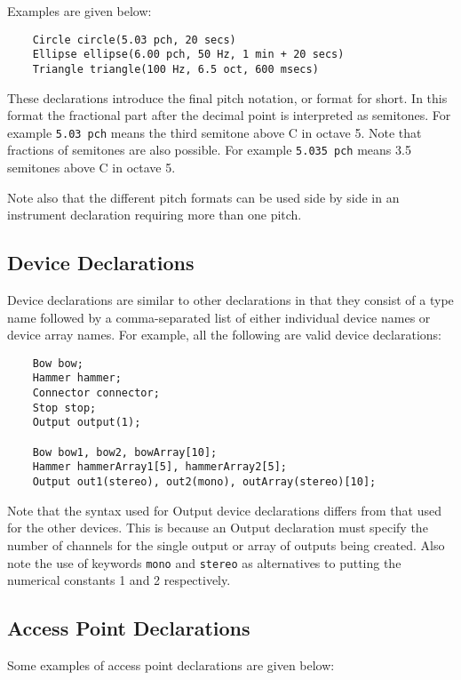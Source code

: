 Examples are given below:

\begin{verbatim}
    Circle circle(5.03 pch, 20 secs)
    Ellipse ellipse(6.00 pch, 50 Hz, 1 min + 20 secs)
    Triangle triangle(100 Hz, 6.5 oct, 600 msecs)
\end{verbatim}

These declarations introduce the final pitch notation,
or  format for short. In this format the fractional part after
the decimal point is interpreted as semitones. For example \verb|5.03 pch|
means the third semitone above C in octave 5. Note that fractions of
semitones are also possible. For example \verb|5.035 pch| means 3.5
semitones above C in octave 5.

Note also that the different pitch formats can be used side by side
in an instrument declaration requiring more than one pitch.

\subsection{Device Declarations}
Device declarations are similar to other declarations in that they
consist of a type name followed by a comma-separated list of either
individual device names or device array names. For example, all the
following are valid device declarations:

\begin{verbatim}
    Bow bow;
    Hammer hammer;
    Connector connector;
    Stop stop;
    Output output(1);

    Bow bow1, bow2, bowArray[10];
    Hammer hammerArray1[5], hammerArray2[5];
    Output out1(stereo), out2(mono), outArray(stereo)[10];
\end{verbatim}

Note that the syntax used for Output device declarations differs
from that used for the other devices. This is because an Output declaration
must specify the number of channels for the single output or array of
outputs being created. Also note the use of keywords \verb|mono| and
\verb|stereo| as alternatives to putting the numerical constants
1 and 2 respectively.

\subsection{Access Point Declarations}
Some examples of access point declarations are given below:

